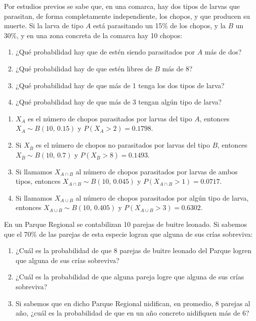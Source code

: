 {Por estudios previos se sabe que, en una comarca, hay dos tipos de larvas que parasitan, de forma completamente
independiente, los chopos, y que producen su muerte.
Si la larva de tipo $A$ está parasitando un 15\% de los chopos, y la $B$ un 30\%, y en una zona concreta de la comarca
hay 10 chopos:
\begin{enumerate}
\item ¿Qué probabilidad hay que de estén siendo parasitados por $A$ más de dos?
\item ¿Qué probabilidad hay de que estén libres de $B$ más de 8?
\item ¿Qué probabilidad hay de que más de 1 tenga los dos tipos de larva?
\item ¿Qué probabilidad hay de que más de 3 tengan algún tipo de larva?
\end{enumerate}
}
{
\begin{enumerate}
\item $X_A$ es el número de chopos parasitados por larvas del tipo $A$, entonces $X_A\sim B(10,\,0.15)$ y
$P(X_A>2)=0.1798$.
\item Si $X_{\overline{B}}$ es el número de chopos no parasitados por larvas del tipo $B$, entonces
$X_{\overline{B}}\sim B(10,\,0.7)$ y $P(X_{\overline{B}}>8)=0.1493$.
\item Si llamamos $X_{A\cap B}$ al número de chopos parasitados por larvas de ambos tipos, entonces $X_{A\cap B}\sim
B(10,\,0.045)$ y $P(X_{A\cap B}>1)=0.0717$.
\item Si llamamos $X_{A\cup B}$ al número de chopos parasitados por algún tipo de larva, entonces $X_{A\cup B}\sim
B(10,\,0.405)$ y $P(X_{A\cup B}>3)=0.6302$.
\end{enumerate}
}
{}


{En un Parque Regional se contabilizan 10 parejas de buitre leonado. Si sabemos que el 70\% de las parejas de esta especie logran que alguna de sus crías sobreviva:
\begin{enumerate}
\item ¿Cuál es la probabilidad de que 8 parejas de buitre leonado del Parque logren que alguna de sus crías sobreviva?
\item ¿Cuál es la probabilidad de que alguna pareja logre que alguna de sus crías sobreviva?
\item Si sabemos que en dicho Parque Regional nidifican, en promedio, 8 parejas al año, ¿cuál es la probabilidad de que en un año concreto nidifiquen más de 6?
\end{enumerate}
}
{}
{}


